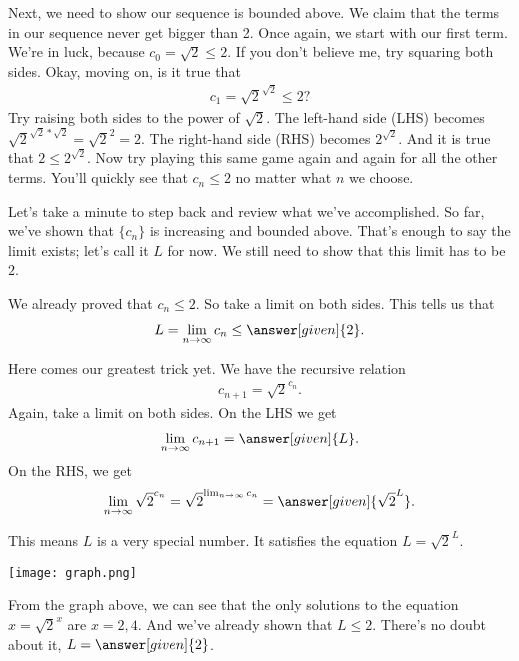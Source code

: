 \documentclass{ximera}
\begin{document}
\begin{exercise}
\begin{exercise}
		\begin{exercise}
			Next, we need to show our sequence is bounded above. We claim that the terms in our sequence never get bigger than 2. Once again, we start with our first term. We're in luck, because $c_0=\sqrt{2} \leq 2$. If you don't believe me, try squaring both sides. Okay, moving on, is it true that
			\begin{align*}
			c_{1}=\sqrt{2}^{\sqrt{2}} \leq 2?
			\end{align*}
			Try raising both sides to the power of $\sqrt{2}$. The left-hand side (LHS) becomes $\sqrt{2}^{\sqrt{2}*\sqrt{2}} = \sqrt{2}^2=2$. The right-hand side (RHS) becomes $2^{\sqrt{2}}$. And it is true that $2\leq 2^{\sqrt{2}}$. Now try playing this same game again and again for all the other terms. You'll quickly see that $c_n \leq 2$ no matter what $n$ we choose.
		\end{exercise}
		
		\begin{exercise}
			Let's take a minute to step back and review what we've accomplished. So far, we've shown that $\{c_n\}$ is increasing and bounded above. That's enough to say the limit exists; let's call it $L$ for now. We still need to show that this limit has to be $2$.
			
			We already proved that $c_{n} \leq 2$. So take a limit on both sides. This tells us that
			\begin{align*}
			L = \lim_{n \to \infty} c_n \leq \answer[given]{2}.
			\end{align*}
			
			Here comes our greatest trick yet. We have the recursive relation
			\begin{align*}
			c_{n+1} = \sqrt{2}^{c_n}.
			\end{align*}
			Again, take a limit on both sides. On the LHS we get
			\begin{align*}
			\lim_{n \to \infty} c_{n+1} = \answer[given]{L}.
			\end{align*}
			On the RHS, we get
			\begin{align*}
			\lim_{n \to \infty} \sqrt{2}^{c_n} = \sqrt{2}^{ \lim_{n \to \infty} c_n} = \answer[given]{\sqrt{2}^L}.
			\end{align*}
			
			\begin{exercise}
				This means $L$ is a very special number. It satisfies the equation $L=\sqrt{2}^L$.
				
				\begin{image}
					\texttt{[image: graph.png]}
				\end{image}
				
				From the graph above, we can see that the only solutions to the equation $x=\sqrt{2}^x$ are $x=2,4$. And we've already shown that $L \leq 2$. There's no doubt about it, $L=\answer[given]{2}$.
			\end{exercise}
			
		
		\end{exercise}
		
	\end{exercise}
	
	
	
\end{exercise}
\end{document}
